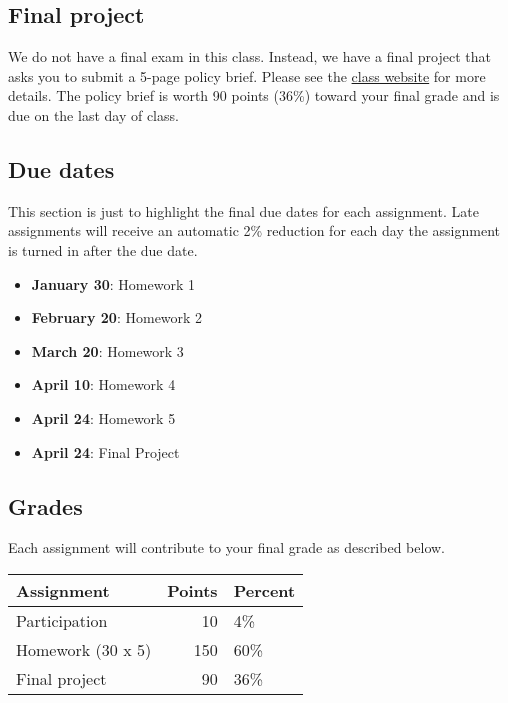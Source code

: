 \documentclass[11pt,]{article}
\providecommand{\tightlist}{%
  \setlength{\itemsep}{0pt}\setlength{\parskip}{0pt}}
\begin{document}
\hypertarget{final-project}{%
\subsection{Final project}\label{final-project}}

We do not have a final exam in this class. Instead, we have a final
project that asks you to submit a 5-page policy brief. Please see the
\href{https://econ470s23.classes.ianmccarthyecon.com/}{class website}
for more details. The policy brief is worth 90 points (36\%) toward your
final grade and is due on the last day of class.

\hypertarget{due-dates}{%
\subsection{Due dates}\label{due-dates}}

This section is just to highlight the final due dates for each
assignment. Late assignments will receive an automatic 2\% reduction for
each day the assignment is turned in after the due date.

\begin{itemize}
\tightlist
\item
  \textbf{January 30}: Homework 1
\item
  \textbf{February 20}: Homework 2
\item
  \textbf{March 20}: Homework 3
\item
  \textbf{April 10}: Homework 4
\item
  \textbf{April 24}: Homework 5
\item
  \textbf{April 24}: Final Project
\end{itemize}

\hypertarget{grades}{%
\subsection{Grades}\label{grades}}

Each assignment will contribute to your final grade as described below.

\begin{longtable}[]{@{}lrl@{}}
\toprule()
Assignment & Points & Percent \\
\midrule()
\endhead
Participation & 10 & 4\% \\
Homework (30 x 5) & 150 & 60\% \\
Final project & 90 & 36\% \\
\bottomrule()
\end{longtable}
\end{document}
